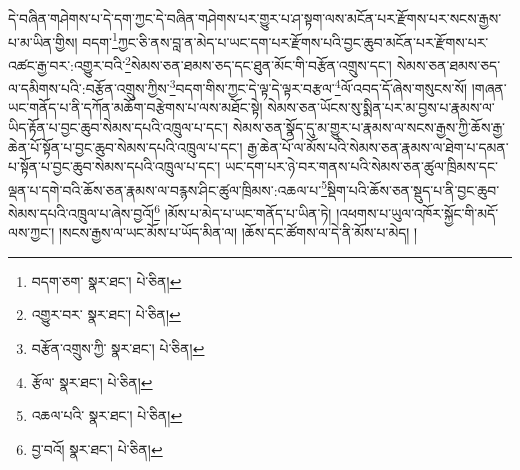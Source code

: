 དེ་བཞིན་གཤེགས་པ་དེ་དག་ཀྱང་དེ་བཞིན་གཤེགས་པར་གྱུར་པ་ཤ་སྟག་ལས་མངོན་པར་རྫོགས་པར་སངས་རྒྱས་པ་མ་ཡིན་གྱིས། བདག་\footnote{བདག་ཅག་  སྣར་ཐང་།  པེ་ཅིན། }ཀྱང་ཅི་ནས་བླ་ན་མེད་པ་ཡང་དག་པར་རྫོགས་པའི་བྱང་ཆུབ་མངོན་པར་རྫོགས་པར་འཚང་རྒྱ་བར་:འགྱུར་བའི་\footnote{འགྱུར་བར་  སྣར་ཐང་།  པེ་ཅིན། }སེམས་ཅན་ཐམས་ཅད་དང་ཐུན་མོང་གི་བརྩོན་འགྲུས་དང་། སེམས་ཅན་ཐམས་ཅད་ལ་དམིགས་པའི་:བརྩོན་འགྲུས་ཀྱིས་\footnote{བརྩོན་འགྲུས་ཀྱི་  སྣར་ཐང་།  པེ་ཅིན། }བདག་གིས་ཀྱང་དེ་ལྟ་དེ་ལྟར་བརྩལ་\footnote{རྩོལ་  སྣར་ཐང་།  པེ་ཅིན། }ལོ་འབད་དོ་ཞེས་གསུངས་སོ། །གཞན་ཡང་གནོད་པ་ནི་དཀོན་མཆོག་བརྩེགས་པ་ལས་མཐོང་སྟེ། སེམས་ཅན་ཡོངས་སུ་སྨིན་པར་མ་བྱས་པ་རྣམས་ལ་ཡིད་རྟོན་པ་བྱང་ཆུབ་སེམས་དཔའི་འཁྲུལ་པ་དང་། སེམས་ཅན་སྣོད་དུ་མ་གྱུར་པ་རྣམས་ལ་སངས་རྒྱས་ཀྱི་ཆོས་རྒྱ་ཆེན་པོ་སྟོན་པ་བྱང་ཆུབ་སེམས་དཔའི་འཁྲུལ་པ་དང་། རྒྱ་ཆེན་པོ་ལ་མོས་པའི་སེམས་ཅན་རྣམས་ལ་ཐེག་པ་དམན་པ་སྟོན་པ་བྱང་ཆུབ་སེམས་དཔའི་འཁྲུལ་པ་དང་། ཡང་དག་པར་ཉེ་བར་གནས་པའི་སེམས་ཅན་ཚུལ་ཁྲིམས་དང་ལྡན་པ་དགེ་བའི་ཆོས་ཅན་རྣམས་ལ་བརྙས་ཤིང་ཚུལ་ཁྲིམས་:འཆལ་པ་\footnote{འཆལ་པའི་  སྣར་ཐང་།  པེ་ཅིན། }སྡིག་པའི་ཆོས་ཅན་སྡུད་པ་ནི་བྱང་ཆུབ་སེམས་དཔའི་འཁྲུལ་པ་ཞེས་བྱའོ།\footnote{བྱ་བའོ།  སྣར་ཐང་།  པེ་ཅིན། } །མོས་པ་མེད་པ་ཡང་གནོད་པ་ཡིན་ཏེ། །འཕགས་པ་ཡུལ་འཁོར་སྐྱོང་གི་མདོ་ལས་ཀྱང་། །སངས་རྒྱས་ལ་ཡང་མོས་པ་ཡོད་མིན་ལ། །ཆོས་དང་ཚོགས་ལ་དེ་ནི་མོས་པ་མེད། །
